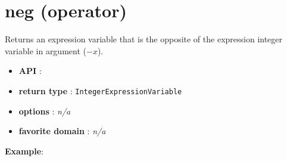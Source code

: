 \label{neg}
\hypertarget{neg}{}

\section{neg (operator)}\label{neg:negoperator}\hypertarget{neg:negoperator}{}

Returns an expression variable that is the opposite of the expression integer variable in argument (\(-x\)).

\begin{itemize}
	\item \textbf{API} : 
	\item \textbf{return type} : \texttt{IntegerExpressionVariable}
	\item \textbf{options} : \emph{n/a}
	\item \textbf{favorite domain} : \emph{n/a}
\end{itemize}

\textbf{Example}:

